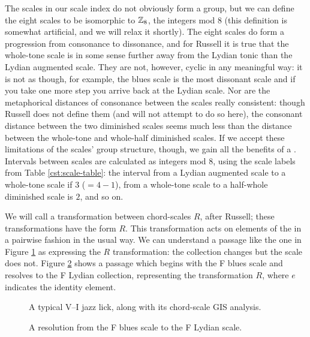 The scales in our scale index do not obviously form a group, but we can define
the eight scales to be isomorphic to $\mathbb{Z}_8$, the integers mod 8 (this
definition is somewhat artificial, and we will relax it shortly). The eight
scales do form a progression from consonance to dissonance, and for Russell it
is true that the whole-tone scale is in some sense further away from the
Lydian tonic than the Lydian augmented scale. They are not,
however, cyclic in any meaningful way: it is not as though, for example, the
blues scale is the most dissonant scale and if you take one more step you
arrive back at the Lydian scale. Nor are the metaphorical distances of
consonance between the scales really consistent: though Russell does not
define them (and will not attempt to do so here), the consonant distance
between the two diminished scales seems much less than the distance between
the whole-tone and whole-half diminished scales.
If we accept these limitations of the scales' group structure, though, we gain
all the benefits of a \gis. Intervals between scales are calculated as
integers mod 8, using the scale labels from Table \ref{cst:scale-table}: the
interval from a Lydian augmented scale to a whole-tone scale if $3$ ($=4-1$),
from a whole-tone scale to a half-whole diminished scale is $2$, and so on.

We will call a transformation between chord-scales $R$, after Russell; these
transformations have the form $R$. This transformation acts on
elements of the \gis in a pairwise fashion in the usual way. We can understand
a passage like the one in Figure \ref{cst:gis-fiveone} as expressing the
$R$ transformation: the collection changes but the scale does not.
Figure \ref{cst:gis-blues-lyd} shows a passage which begins with the F blues
scale and resolves to the F Lydian collection, representing the transformation
$R$, where $e$ indicates the identity element.

\begin{figure}[tbp]
  \caption{A typical V--I jazz lick, along with its chord-scale \textsc{GIS}
    analysis.}
  \label{cst:gis-fiveone}
\end{figure}

\begin{figure}[tbp]
  \caption{A resolution from the F blues scale to the F Lydian scale.}
  \label{cst:gis-blues-lyd}
\end{figure}

